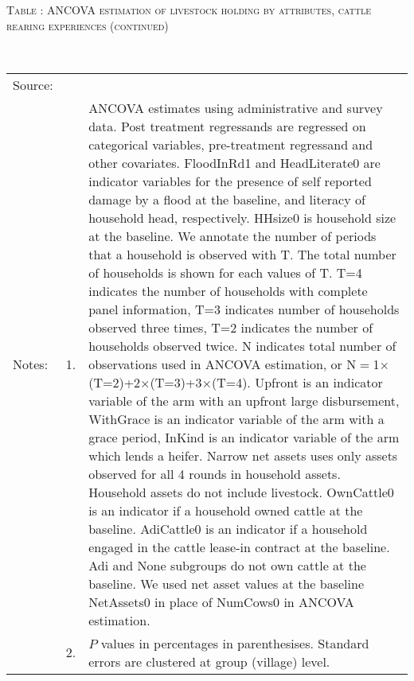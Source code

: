 \addtocounter{table}{-1}
\hspace{-1cm}\begin{minipage}[t]{14cm}
\hfil\textsc{\normalsize Table \thetable: ANCOVA estimation of livestock holding by attributes, cattle rearing experiences (continued)\label{tab ANCOVA livestock holding Experience attributes 2}}\\
\setlength{\tabcolsep}{1pt}
\setlength{\baselineskip}{8pt}
\renewcommand{\arraystretch}{.52}
\hfil{}\\
\renewcommand{\arraystretch}{.8}
\setlength{\tabcolsep}{1pt}
\begin{tabular}{>{\hfill\scriptsize}p{1cm}<{}>{\hfill\scriptsize}p{.25cm}<{}>{\scriptsize}p{12cm}<{\hfill}}
Source:& \multicolumn{2}{l}{\scriptsize Estimated with GUK administrative and survey data.}\\
Notes: & 1. & ANCOVA estimates using administrative and survey data. Post treatment regressands are regressed on categorical variables, pre-treatment regressand and other covariates. \textsf{FloodInRd1} and \textsf{HeadLiterate0} are indicator variables for the presence of self reported damage by a flood at the baseline, and literacy of household head, respectively. \textsf{HHsize0} is household size at the baseline. We annotate the number of periods that a household is observed with \textsf{T}. The total number of households is shown for each values of \textsf{T}. \textsf{T=4} indicates the number of households with complete panel information, \textsf{T=3} indicates number of households observed three times, \textsf{T=2} indicates the number of households observed twice. \textsf{N} indicates total number of observations used in ANCOVA estimation, or \textsf{N$=$1$\times$(T=2)+2$\times$(T=3)+3$\times$(T=4)}.  \textsf{Upfront} is an indicator variable of the arm with an upfront large disbursement, \textsf{WithGrace} is an indicator variable of the arm with a grace period, \textsf{InKind} is an indicator variable of the arm which lends a heifer. Narrow net assets uses only assets observed for all 4 rounds in household assets. Household assets do not include livestock. \textsf{OwnCattle0} is an indicator if a household owned cattle at the baseline. \textsf{AdiCattle0} is an indicator if a household engaged in the cattle lease-in contract at the baseline.  \textsf{Adi} and \textsf{None} subgroups do not own cattle at the baseline. We used net asset values at the baseline \textsf{NetAssets0} in place of \textsf{NumCows0} in ANCOVA estimation.\\
& 2. & $P$ values in percentages in parenthesises. Standard errors are clustered at group (village) level.
\end{tabular}
\end{minipage}



